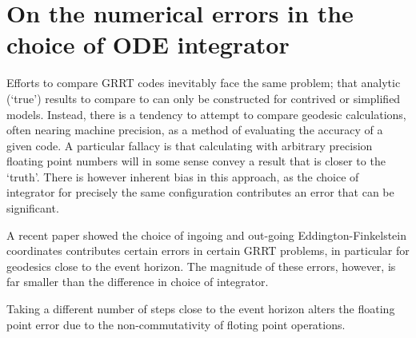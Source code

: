 \section{On the numerical errors in the choice of ODE integrator}

Efforts to compare GRRT codes inevitably face the same problem; that analytic (`true') results to compare to can only be constructed for contrived or simplified models. Instead, there is a tendency to attempt to compare geodesic calculations, often nearing machine precision, as a method of evaluating the accuracy of a given code. A particular fallacy is that calculating with arbitrary precision floating point numbers will in some sense convey a result that is closer to the `truth'. There is however inherent bias in this approach, as the choice of integrator for precisely the same configuration contributes an error that can be significant.

A recent paper showed the choice of ingoing and out-going Eddington-Finkelstein coordinates contributes certain errors in certain GRRT problems, in particular for geodesics close to the event horizon. The magnitude of these errors, however, is far smaller than the difference in choice of integrator.

Taking a different number of steps close to the event horizon alters the floating point error due to the non-commutativity of floting point operations.



